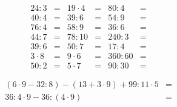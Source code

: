 \documentclass[14pt, a4paper]{extarticle}
\begin{document}
    \begin{align*}
        24:3 &=&    19\cdot4 &=& 80:4   &=\\
        40:4 &=&    39:6     &=& 54:9   &=\\ 
        76:4 &=&    58:9     &=& 36:6   &=\\
        44:7 &=&    78:10    &=& 240:3  &=\\
        39:6 &=&    50:7     &=& 17:4   &=\\
        3\cdot8 &=& 9\cdot6  &=& 360:60 &=\\
        50:2    &=& 5\cdot7  &=& 90:30 &=
    \end{align*}

    \begin{align*}
        (6\cdot9 - 32:8) - (13 + 3\cdot9) + 99:11\cdot5&=\\
        36:4\cdot9 - 36:(4\cdot9) &= 
    \end{align*}
\end{document}
